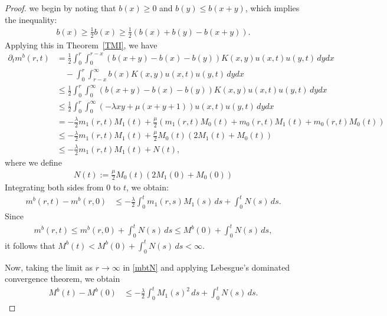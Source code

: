 \documentclass[10pt,a4paper]{amsart}
\begin{document}
\begin{proof}
we begin by noting that $b(x)\ge 0$ and $b(y)\le b(x+y)$,
which implies the inequality:
\begin{align*}
b(x)\ge \frac{1}{2}b(x)\ge \frac{1}{2}(b(x)+b(y)-b(x+y)).
\end{align*}
Applying this in Theorem~\ref{TMI}, we have
\begin{align*}
\partial_t m^b (r,t) &=\frac{1}{2} \int^r_0\int^{r-x}_0 
(b(x+y)-b(x)-b(y))K(x,y)u(x,t)u(y,t)\,dydx \\
&\quad -\int^r_0\int^\infty_{r-x} b(x)K(x,y)u(x,t) u(y,t)\,dydx \\
&\leq \frac{1}{2}\int^r_0\int^{\infty}_0 
(b(x+y)-b(x)-b(y))K(x,y)u(x,t)u(y,t)\,dydx \\
&\leq \frac{1}{2}\int^r_0\int^{\infty}_0 
(-\lambda xy+\mu (x+y+1))u(x,t)u(y,t)\,dydx \\
&=-\frac{\lambda}{2}m_1(r,t)M_1(t)
+\frac{\mu}{2}\left(
m_1(r,t)M_0(t)+m_0(r,t)M_1(t)
+m_0(r,t)M_0(t)\right)\\
&\le 
-\frac{\lambda}{2}m_1(r,t)M_1(t)
+\frac{\mu}{2}M_0(t)(2M_1(t)+M_0(t))\\
&\le 
-\frac{\lambda}{2}m_1(r,t)M_1(t)
+N(t),
\end{align*}
where we define
\begin{align*}
N(t):=\frac{\mu}{2}M_0(t)(2M_1(0)+M_0(0))
\end{align*}
Integrating both sides from $0$ to $t$,
we obtain:
\begin{align}\label{mbtN}
m^b (r,t)-m^b (r,0)
&\le
-\frac{\lambda}{2}\int_{0}^{t}
m_1(r,s)M_1(s)\,ds
+\int_0^tN(s)\,ds.
\end{align}
Since 
\begin{align*}
m^b (r,t)\le m^b (r,0) +\int_0^tN(s)\,ds\le M^b(0)+\int_0^tN(s)\,ds,
\end{align*}
it follows that $M^b(t)< M^b(0)+\int_0^tN(s)\,ds<\infty$.

Now, taking the limit as $r\to\infty$ in \eqref{mbtN} and applying Lebesgue's dominated convergence theorem, we obtain
\begin{align}\label{MMN}
M^b(t)-M^b(0)&\leq
-\frac{\lambda}{2}\int_{0}^{t}
M_1(s)^2\,ds
+\int_0^tN(s)\,ds.
\end{align}


\end{proof}
\end{document}
